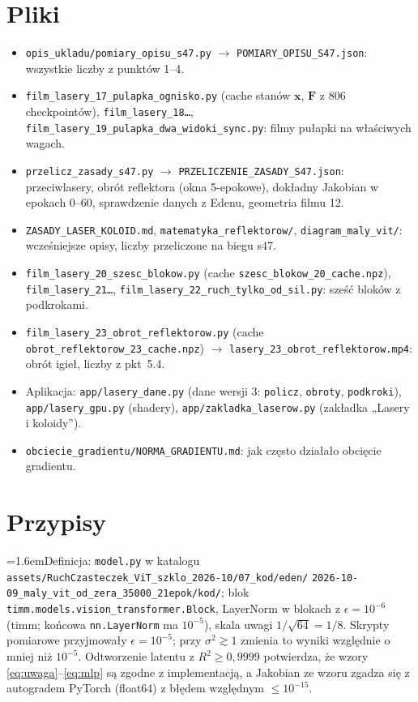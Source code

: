 \documentclass[a4paper,11pt]{article}
\newcounter{pn}
\newcommand{\przypis}[2]{\refstepcounter{pn}\label{pp:#1}\par\noindent\hangindent=1.6em\hangafter=1\makebox[1.6em][l]{\textbf{\thepn.}}#2\par\medskip}
\begin{document}
\section*{Pliki}
\begin{itemize}
\item \texttt{opis\_ukladu/pomiary\_opisu\_s47.py} $\to$ \texttt{POMIARY\_OPISU\_S47.json}: wszystkie liczby z punktów 1--4.
\item \texttt{film\_lasery\_17\_pulapka\_ognisko.py} (cache stanów $\bm x$, $\bm F$ z 806 checkpointów), \texttt{film\_lasery\_18\ldots},
\texttt{film\_lasery\_19\_pulapka\_dwa\_widoki\_sync.py}: filmy pułapki na właściwych wagach.
\item \texttt{przelicz\_zasady\_s47.py} $\to$ \texttt{PRZELICZENIE\_ZASADY\_S47.json}: przeciwlasery, obrót reflektora (okna 5-epokowe),
dokładny Jakobian w epokach 0--60, sprawdzenie danych z Edenu, geometria filmu 12.
\item \texttt{ZASADY\_LASER\_KOLOID.md}, \texttt{matematyka\_reflektorow/}, \texttt{diagram\_maly\_vit/}: wcześniejsze opisy, liczby przeliczone
na biegu s47.
\item \texttt{film\_lasery\_20\_szesc\_blokow.py} (cache \texttt{szesc\_blokow\_20\_cache.npz}), \texttt{film\_lasery\_21\ldots},
\texttt{film\_lasery\_22\_ruch\_tylko\_od\_sil.py}: sześć bloków z podkrokami.
\item \texttt{film\_lasery\_23\_obrot\_reflektorow.py} (cache \texttt{obrot\_reflektorow\_23\_cache.npz}) $\to$
\texttt{lasery\_23\_obrot\_reflektorow.mp4}: obrót igieł, liczby z pkt~5.4.
\item Aplikacja: \texttt{app/lasery\_dane.py} (dane wersji 3: \texttt{policz}, \texttt{obroty}, \texttt{podkroki}),
\texttt{app/lasery\_gpu.py} (shadery), \texttt{app/zakladka\_laserow.py} (zakładka „Lasery i koloidy”).
\item \texttt{obciecie\_gradientu/NORMA\_GRADIENTU.md}: jak często działało obcięcie gradientu.
\end{itemize}

\section*{Przypisy}
\small

\przypis{model}{Definicja: \texttt{model.py} w katalogu \texttt{assets/RuchCzasteczek\_ViT\_szklo\_2026-10/07\_kod/eden/} \texttt{2026-10-09\_maly\_vit\_od\_zera\_35000\_21epok/kod/};
blok \texttt{timm.models.vision\_transformer.Block}, LayerNorm w blokach z $\epsilon=10^{-6}$ (timm; końcowa \texttt{nn.LayerNorm} ma $10^{-5}$),
skala uwagi $1/\sqrt{64}=1/8$. Skrypty pomiarowe przyjmowały $\epsilon=10^{-5}$; przy $\sigma^2\gtrsim1$ zmienia to wyniki względnie o mniej niż $10^{-5}$.
Odtworzenie latentu z $R^2\ge0{,}9999$ potwierdza, że wzory \eqref{eq:uwaga}--\eqref{eq:mlp} są zgodne z implementacją, a Jakobian ze wzoru
zgadza się z autogradem PyTorch (float64) z błędem względnym $\le10^{-15}$.}
\end{document}
